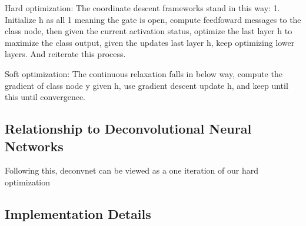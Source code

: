 Hard optimization: The coordinate descent frameworks stand in this way: 1. Initialize h as all 1 meaning the gate is open, compute feedfoward messages to the class node, then given the current activation status, optimize the last layer h to maximize the class output, given the updates last layer h, keep optimizing lower layers. And reiterate this process.

Soft optimization: The continuous relaxation falls in below way, compute the gradient of class node y given h, use gradient descent update h, and keep until this until convergence.

\subsection{Relationship to Deconvolutional Neural Networks}

Following this, deconvnet can be viewed as a one iteration of our hard optimization

\subsection{Implementation Details}

